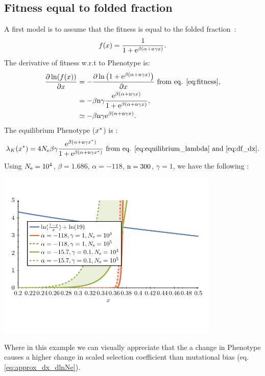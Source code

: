 \subsection{Fitness equal to folded fraction}
A first model is to assume that the fitness is equal to the folded fraction~\citep{Goldstein2013}:
\begin{gather}
f(x) = \frac{1}{1 + \mathrm{e}^{\beta(\alpha + \text{n} \gamma x)}}. \label{eq:fitness}
\end{gather}
The derivative of fitness w.r.t to \gls{Phenotype} is:
\begin{align}
\frac{\partial \ln (f(x))}{\partial x}  & = - \frac{\partial \ln \left( 1 + \mathrm{e}^{\beta(\alpha + \text{n} \gamma x)} \right)}{\partial x} \text{ from eq. \ref{eq:fitness}}, \\
& = - \beta \text{n} \gamma \frac{\mathrm{e}^{\beta(\alpha + \text{n} \gamma x)}}{1 + \mathrm{e}^{\beta(\alpha + \text{n} \gamma x)}} \label{eq:df_dx},\\
& \simeq - \beta \text{n} \gamma \mathrm{e}^{\beta(\alpha + \text{n} \gamma x)}.
\end{align}
The equilibrium \gls{Phenotype} ($x^{*}$) is :
\begin{gather}
\lambda_{K}(x^{*}) = 4N_{\mathrm{e}} \beta \gamma \frac{\mathrm{e}^{\beta(\alpha + \text{n} \gamma x^{*})}}{1 + \mathrm{e}^{\beta(\alpha + \text{n} \gamma x^{*})}}  \text{ from eq. \ref{eq:equilibrium_lambda} and \ref{eq:df_dx}}.
\end{gather}
Using $N_{\mathrm{e}}=10^4$, $\beta=1.686$, $\alpha = -118$, $\text{n}=300$, $\gamma=1$, we have the following :
\begin{center}
\includegraphics[width=0.8\textwidth, page=4] {analytical-relaxation}
\end{center}
Where in this example we can visually appreciate that the a change in \gls{Phenotype} causes a higher change in scaled selection coefficient than mutational bias (eq. \ref{eq:approx_dx_dlnNe}).
